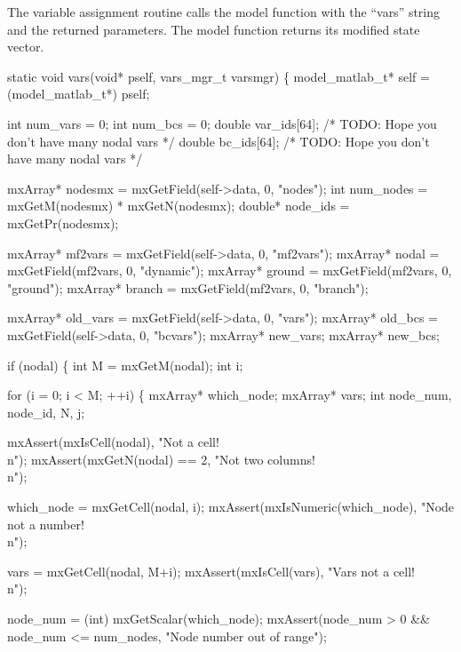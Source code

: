 \nwendcode{}\nwdocspar

The variable assignment routine calls the model function with the
``vars'' string and the returned parameters.  The model function
returns its modified state vector.

\nwenddocs{}\plusendmoddef
static void vars(void* pself, vars_mgr_t varsmgr)
\{
    model_matlab_t* self = (model_matlab_t*) pself;

    int num_vars = 0;
    int num_bcs  = 0;
    double var_ids[64];   /* TODO: Hope you don't have many nodal vars */
    double bc_ids[64];    /* TODO: Hope you don't have many nodal vars */

    mxArray* nodesmx   = mxGetField(self->data, 0, "nodes");
    int      num_nodes = mxGetM(nodesmx) * mxGetN(nodesmx);
    double*  node_ids  = mxGetPr(nodesmx);

    mxArray* mf2vars = mxGetField(self->data, 0, "mf2vars");
    mxArray* nodal   = mxGetField(mf2vars, 0, "dynamic");
    mxArray* ground  = mxGetField(mf2vars, 0, "ground");
    mxArray* branch  = mxGetField(mf2vars, 0, "branch");

    mxArray* old_vars = mxGetField(self->data, 0, "vars");
    mxArray* old_bcs  = mxGetField(self->data, 0, "bcvars");
    mxArray* new_vars;
    mxArray* new_bcs;

    if (nodal) \{
        int M = mxGetM(nodal);
        int i;

        for (i = 0; i < M; ++i) \{
            mxArray* which_node;
            mxArray* vars;
            int node_num, node_id, N, j;

            mxAssert(mxIsCell(nodal), "Not a cell!\\n");
            mxAssert(mxGetN(nodal) == 2, "Not two columns!\\n");

            which_node = mxGetCell(nodal, i);
            mxAssert(mxIsNumeric(which_node), "Node not a number!\\n");

            vars = mxGetCell(nodal, M+i);
            mxAssert(mxIsCell(vars), "Vars not a cell!\\n");

            node_num = (int) mxGetScalar(which_node);
            mxAssert(node_num > 0 && node_num <= num_nodes,
                     "Node number out of range");

